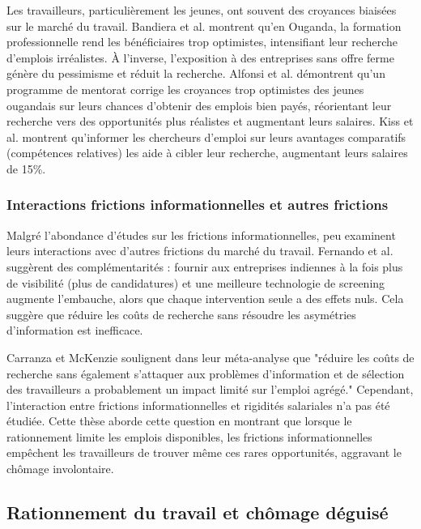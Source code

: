 \documentclass[12pt,a4paper]{article}
\begin{document}
Les travailleurs, particulièrement les jeunes, ont souvent des croyances biaisées sur le marché du travail. Bandiera et al. \citeyearpar{bandiera2023} montrent qu'en Ouganda, la formation professionnelle rend les bénéficiaires trop optimistes, intensifiant leur recherche d'emplois irréalistes. À l'inverse, l'exposition à des entreprises sans offre ferme génère du pessimisme et réduit la recherche. Alfonsi et al. \citeyearpar{alfonsi2022} démontrent qu'un programme de mentorat corrige les croyances trop optimistes des jeunes ougandais sur leurs chances d'obtenir des emplois bien payés, réorientant leur recherche vers des opportunités plus réalistes et augmentant leurs salaires. Kiss et al. \citeyearpar{kiss2023} montrent qu'informer les chercheurs d'emploi sur leurs avantages comparatifs (compétences relatives) les aide à cibler leur recherche, augmentant leurs salaires de 15\%.

\subsubsection{Interactions frictions informationnelles et autres frictions}

Malgré l'abondance d'études sur les frictions informationnelles, peu examinent leurs interactions avec d'autres frictions du marché du travail. Fernando et al. \citeyearpar{fernando2023} suggèrent des complémentarités : fournir aux entreprises indiennes à la fois plus de visibilité (plus de candidatures) et une meilleure technologie de screening augmente l'embauche, alors que chaque intervention seule a des effets nuls. Cela suggère que réduire les coûts de recherche sans résoudre les asymétries d'information est inefficace.

Carranza et McKenzie \citeyearpar{carranza2024} soulignent dans leur méta-analyse que "réduire les coûts de recherche sans également s'attaquer aux problèmes d'information et de sélection des travailleurs a probablement un impact limité sur l'emploi agrégé." Cependant, l'interaction entre frictions informationnelles et rigidités salariales n'a pas été étudiée. Cette thèse aborde cette question en montrant que lorsque le rationnement limite les emplois disponibles, les frictions informationnelles empêchent les travailleurs de trouver même ces rares opportunités, aggravant le chômage involontaire.

\subsection{Rationnement du travail et chômage déguisé}
\end{document}
